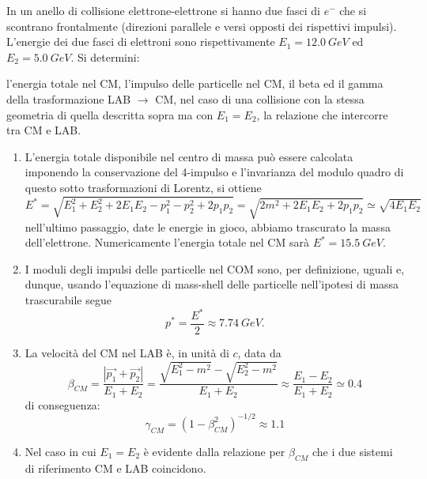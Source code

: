 \begin{Exercise}[title={Cinematica ad un collider}]
In un anello di collisione elettrone-elettrone si hanno due fasci 
di $e^-$ che si scontrano frontalmente (direzioni parallele e versi opposti 
dei rispettivi impulsi). L'energie
dei due fasci di elettroni sono rispettivamente $E_1 = \SI{12.0}{GeV}$ ed
$E_2 = \SI{5.0}{GeV}$. Si determini: 

\Question l'energia totale nel CM, 
\Question l'impulso delle particelle nel CM, 
\Question il beta ed il gamma della trasformazione LAB $\to$ CM,
\Question nel caso di una collisione con la stessa geometria di quella descritta
sopra ma con $E_1=E_2$, la relazione che intercorre tra CM e LAB.
\end{Exercise}
\begin{Answer}
  \begin{enumerate}
  \item  L'energia totale disponibile nel centro di massa pu\`o essere 
    calcolata imponendo la conservazione del 4-impulso e l'invarianza 
    del modulo quadro di questo sotto trasformazioni di Lorentz, si ottiene
    \[
    E^*=\sqrt{E_1^2+E_2^2+2E_1 E_2-p_1^2 - p_2^2 +2 p_1 p_2}=
    \sqrt{2m^2+2 E_1 E_2 +2 p_1 p_2}\simeq \sqrt{4 E_1 E_2}
    \]
    nell'ultimo passaggio, date le energie in gioco, abbiamo trascurato 
    la massa dell'elettrone. Numericamente l'energia totale nel CM sar\`a
    $E^*=\SI{15.5}{GeV}$. 
    
  \item I moduli degli impulsi delle particelle nel COM sono, per definizione,
    uguali e, dunque, usando l'equazione di mass-shell delle particelle
    nell'ipotesi di massa trascurabile segue 
    \[
    p^*=\frac{E^*}{2} \approx \SI{7.74}{GeV}.
    \]

  \item       La velocit\`a del CM nel LAB \`e, in unit\`a di $c$, data da
    \[
    \beta_{CM}=\frac{|\vec{p_1}+\vec{p_2}|}{E_1+E_2}=
    \frac{\sqrt{E_1^2-m^2} - \sqrt{E_2^2-m^2}}{E_1+E_2} \approx 
    \frac{E_1-E_2}{E_1+E_2} \simeq 0.4
    \]
    di conseguenza:
    \[
    \gamma_{CM}=(1-\beta_{CM}^2)^{-1/2} \approx 1.1
    \]

    \item Nel caso in cui $E_1=E_2$ \`e evidente dalla relazione per $\beta_{CM}$ 
      che i due sistemi di riferimento CM e LAB coincidono.
  \end{enumerate}
\end{Answer}

